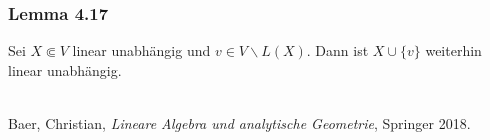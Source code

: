 \documentclass{article}
\begin{document}
\subsubsection*{Lemma 4.17}
Sei $X \Subset V$ linear unabhängig und $v \in V \backslash L(X)$. Dann ist $X \cup \{v\}$ weiterhin linear unabhängig. \\
\\




\newpage
\begin{thebibliography}{9}
    Baer, Christian,
    \emph{Lineare Algebra und analytische Geometrie},
    Springer 2018.
    \end{thebibliography}
\end{document}
